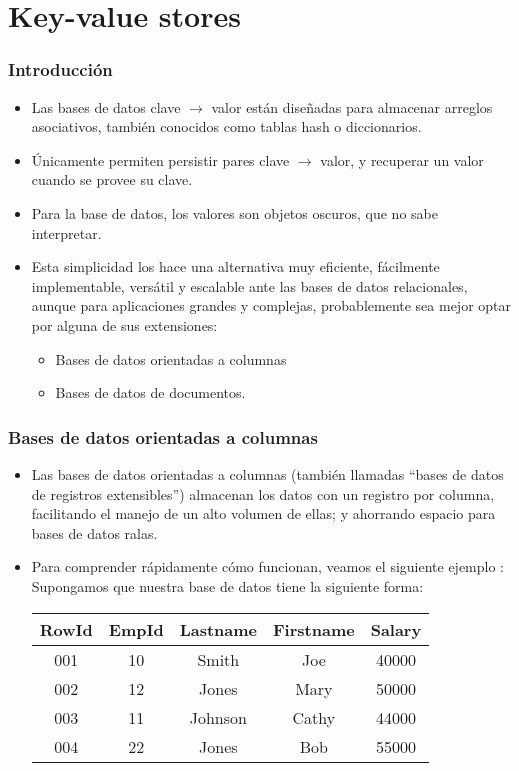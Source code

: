 \section{Key-value stores}
\begin{frame}
\frametitle{Introducción}
\begin{itemize}
\item	Las bases de datos clave $\rightarrow$ valor están diseñadas para almacenar arreglos asociativos, también conocidos como tablas hash o diccionarios. \pause
\item	Únicamente permiten persistir pares clave $\rightarrow$ valor, y recuperar un valor cuando se provee su clave. \pause
\item	Para la base de datos, los valores son objetos oscuros, que no sabe interpretar. \pause
\item	Esta simplicidad los hace una alternativa muy eficiente, fácilmente implementable, versátil y escalable ante las bases de datos relacionales, aunque para aplicaciones grandes y complejas, probablemente sea mejor optar por alguna de sus extensiones: \pause
\begin{itemize}
		\item	Bases de datos orientadas a columnas \pause
		\item	Bases de datos de documentos. \pause
\end{itemize}
\end{itemize}
\end{frame}

\begin{frame}
\frametitle{Bases de datos orientadas a columnas}
\begin{itemize}
\item	Las bases de datos orientadas a columnas (también llamadas ``bases de datos de registros extensibles'') almacenan los datos con un registro por columna, facilitando el manejo de un alto volumen de ellas; y ahorrando espacio para bases de datos ralas. \pause
\item	Para comprender rápidamente cómo funcionan, veamos el siguiente ejemplo : \pause \\
		Supongamos que nuestra base de datos tiene la siguiente forma: \\
		\begin{tabular}{|c|c|c|c|c|}
		\hline
		RowId	&	EmpId	&	Lastname	&	Firstname	&	Salary \\ \hline
		001		&	10		&	Smith		&	Joe			&	40000 \\ \hline
		002		&	12		&	Jones		&	Mary		&	50000 \\ \hline 
		003		&	11		&	Johnson		&	Cathy		&	44000  \\ \hline 
		004		&	22		&	Jones		&	Bob			&	55000  \\ \hline 
		\end{tabular}
\end{itemize}
\end{frame}

